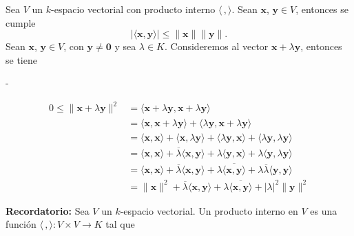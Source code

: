 \begin{theorem}
    Sea $V$ un $k$-espacio vectorial con producto interno $\langle \, , \rangle$. Sean $\mathbf{x}$, $\mathbf{y} \in V$, entonces se cumple
    $$| \langle \mathbf{x}, \mathbf{y} \rangle | \leq \| \mathbf{x} \| \| \mathbf{y} \|.$$
    \demostracion Sean $\mathbf{x}$, $\mathbf{y} \in V$, con $\mathbf{y} \neq \mathbf{0}$ y sea $\lambda \in K$. Consideremos al vector $\mathbf{x} + \lambda \mathbf{y}$, entonces se tiene \vspace{-0.7cm}
    \begin{adjustwidth}{0mm}{-\wholeMargin}
        \noindent\begin{minipage}[c]{10cm}
            \begin{align*}
                0 \leq \| \mathbf{x} + \lambda \mathbf{y} \|^2 & = \langle \mathbf{x} + \lambda\mathbf{y}, \mathbf{x} + \lambda\mathbf{y} \rangle \\
                & = \langle \mathbf{x}, \mathbf{x} + \lambda \mathbf{y} \rangle + \langle \lambda \mathbf{y}, \mathbf{x} + \lambda\mathbf{y} \rangle \\
                & = \langle \mathbf{x}, \mathbf{x} \rangle + \langle \mathbf{x}, \lambda \mathbf{y} \rangle + \langle \lambda \mathbf{y}, \mathbf{x} \rangle + \langle \lambda \mathbf{y}, \lambda \mathbf{y} \rangle \\
                & = \langle \mathbf{x}, \mathbf{x} \rangle + \overline{\lambda} \langle \mathbf{x}, \mathbf{y} \rangle + \lambda \langle \mathbf{y}, \mathbf{x} \rangle + \lambda \langle \mathbf{y}, \lambda \mathbf{y} \rangle \\
                & = \langle \mathbf{x}, \mathbf{x} \rangle + \overline{\lambda} \langle \mathbf{x}, \mathbf{y} \rangle + \lambda \overline{\langle \mathbf{x}, \mathbf{y} \rangle} + \lambda\overline{\lambda} \langle \mathbf{y}, \mathbf{y} \rangle \\
                & = \| \mathbf{x} \|^2 + \overline{\lambda} \langle \mathbf{x}, \mathbf{y} \rangle + \lambda \overline{\langle \mathbf{x}, \mathbf{y} \rangle} + |\lambda|^2 \| \mathbf{y} \|^2
            \end{align*}
        \end{minipage}\hfill
        \begin{minipage}[c]{7.7cm}
            \colorbox{gray!20}{\parbox[c]{\dimexpr\linewidth-3pt-2\fboxsep-2\fboxrule}{\footnotesize
            \textbf{Recordatorio:} Sea $V$ un $k$-espacio vectorial. Un producto interno en $V$ es una función $\langle \, , \rangle :V \times V \longrightarrow K$ tal que\\[-2mm]
}}
\end{minipage}
\end{adjustwidth}
\end{theorem}
